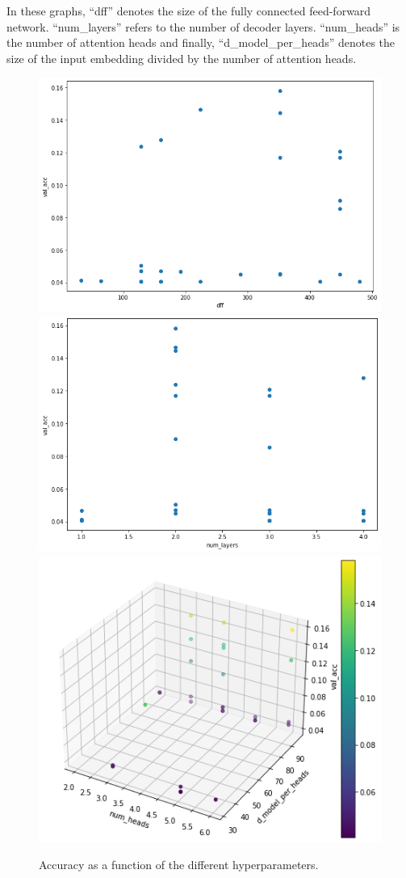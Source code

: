 \documentclass[journal]{IEEEtai}
\begin{document}
In these graphs, ``dff'' denotes the size of the fully connected feed-forward network. ``num\_layers'' refers to the number of decoder layers. ``num\_heads'' is the number of attention heads and finally, ``d\_model\_per\_heads'' denotes the size of the input embedding divided by the number of attention heads.
\begin{figure}
	\centering
  \includegraphics[width=0.45\linewidth]{fig/hp_dff.png}
  \includegraphics[width=0.45\linewidth]{fig/hp_num_layers.png}
  \includegraphics[width=0.5\linewidth]{fig/hp_num_heads_d_model.png}
  \caption{Accuracy as a function of the different hyperparameters.}
  \label{fig:hp}
\end{figure}
\end{document}
